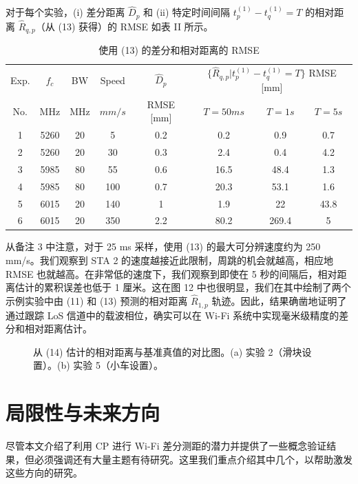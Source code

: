 \documentclass[journal]{IEEEtran}
\begin{document}
对于每个实验，(i) 差分距离 $\hat{D}_p$ 和 (ii) 特定时间间隔 $t_p^{(1)} - t_q^{(1)} = T$ 的相对距离 $\hat{R}_{q,p}$（从 (13) 获得）的 RMSE 如表 II 所示。

\begin{table}[htbp]
\caption{使用 (13) 的差分和相对距离的 RMSE}
\begin{center}
\begin{tabular}{|c|c|c|c|c|c|c|c|}
\hline
Exp. & $f_c$ & BW & Speed & $\hat{D}_p$ & \multicolumn{3}{c|}{$\{\hat{R}_{q,p}|t_p^{(1)}-t_q^{(1)}=T\}$ RMSE [mm]} \\
No. & MHz & MHz & $mm/s$ & RMSE [mm] & $T=50ms$ & $T=1s$ & $T=5s$ \\
\hline
1 & 5260 & 20 & 5 & 0.2 & 0.2 & 0.9 & 0.7 \\
2 & 5260 & 20 & 30 & 0.3 & 2.4 & 0.4 & 4.2 \\
3 & 5985 & 80 & 55 & 0.6 & 16.5 & 48.4 & 1.3 \\
4 & 5985 & 80 & 100 & 0.7 & 20.3 & 53.1 & 1.6 \\
5 & 6015 & 20 & 140 & 1 & 1.9 & 22 & 43.8 \\
6 & 6015 & 20 & 350 & 2.2 & 80.2 & 269.4 & 5 \\
\hline
\end{tabular}
\end{center}
\label{tab:table2}
\end{table}

从备注 3 中注意，对于 25 ms 采样，使用 (13) 的最大可分辨速度约为 250 mm/s。我们观察到 STA 2 的速度越接近此限制，周跳的机会就越高，相应地 RMSE 也就越高。在非常低的速度下，我们观察到即使在 5 秒的间隔后，相对距离估计的累积误差也低于 1 厘米。这在图 12 中也很明显，我们在其中绘制了两个示例实验中由 (11) 和 (13) 预测的相对距离 $\hat{R}_{1,p}$ 轨迹。因此，结果确凿地证明了通过跟踪 LoS 信道中的载波相位，确实可以在 Wi-Fi 系统中实现毫米级精度的差分和相对距离估计。

\begin{figure}[htbp]
\centering
{}
\caption{从 (14) 估计的相对距离与基准真值的对比图。(a) 实验 2（滑块设置）。(b) 实验 5（小车设置）。}
\label{fig:fig12}
\end{figure}

\section{局限性与未来方向}
尽管本文介绍了利用 CP 进行 Wi-Fi 差分测距的潜力并提供了一些概念验证结果，但必须强调还有大量主题有待研究。这里我们重点介绍其中几个，以帮助激发这些方向的研究。
\end{document}
